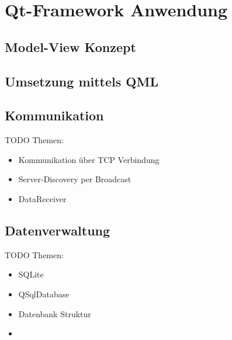 \newpage
\section{Qt-Framework Anwendung}

\subsection{Model-View Konzept}

\subsection{Umsetzung mittels QML}

\subsection{Kommunikation}
TODO Themen:
\begin{itemize}
\item Kommunikation über TCP Verbindung \cite{qtcpserver}
\item Server-Discovery per Broadcast \cite{qudpsocket}
\item DataReceiver
\end{itemize}

\subsection{Datenverwaltung}
TODO Themen:
\begin{itemize}
\item SQLite
\item QSqlDatabase \cite{qsqldatabase}
\item Datenbank Struktur
\item 
\end{itemize}
